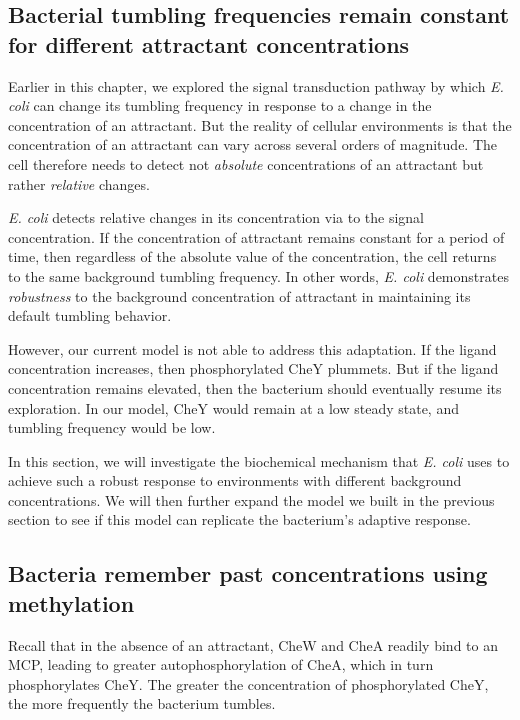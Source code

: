 \subsection{Bacterial tumbling frequencies remain constant for different attractant concentrations}

Earlier in this chapter, we explored the signal transduction pathway by which \textit{E. coli} can change its tumbling frequency in response to a change in the concentration of an attractant. But the reality of cellular environments is that the concentration of an attractant can vary across several orders of magnitude. The cell therefore needs to detect not \textit{absolute} concentrations of an attractant but rather \textit{relative} changes.

\textit{E. coli} detects relative changes in its concentration via  to the signal concentration. If the concentration of attractant remains constant for a period of time, then regardless of the absolute value of the concentration, the cell returns to the same background tumbling frequency. In other words, \textit{E. coli} demonstrates \textit{robustness} to the background concentration of attractant in maintaining its default tumbling behavior.

However, our current model is not able to address this adaptation. If the ligand concentration increases, then phosphorylated CheY plummets. But if the ligand concentration remains elevated, then the bacterium should eventually resume its exploration. In our model, CheY would remain at a low steady state, and tumbling frequency would be low.

In this section, we will investigate the biochemical mechanism that \textit{E. coli} uses to achieve such a robust response to environments with different background concentrations. We will then further expand the model we built in the previous section to see if this model can replicate the bacterium's adaptive response.

\FloatBarrier
{}
\subsection{Bacteria remember past concentrations using methylation}

Recall that in the absence of an attractant, CheW and CheA readily bind to an MCP, leading to greater autophosphorylation of CheA, which in turn phosphorylates CheY. The greater the concentration of phosphorylated CheY, the more frequently the bacterium tumbles.


